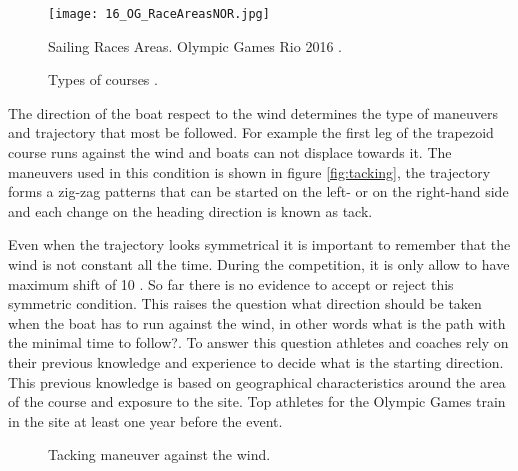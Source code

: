 \begin{figure}[ht]
\centering
 \texttt{[image: 16\_OG\_RaceAreasNOR.jpg]}
  \caption{Sailing Races Areas. Olympic Games Rio 2016 \cite{instr_rio}.}
\label{fig:olymp_areas_rio} 
\end{figure}

\begin{figure}[ht]
  \centering
  \hfill
  \caption{Types of courses \cite{instr_rio}.}
\label{fig:typecourses} 
\end{figure}

The direction of the boat respect to the wind determines the type of maneuvers and trajectory that most be followed. For example the first leg of the trapezoid course runs against the wind and boats can not displace towards it. The maneuvers used in this condition is shown in figure \ref{fig:tacking}, the trajectory forms a zig-zag patterns that can be started on the left- or on the right-hand side and each change on the heading direction is known as tack. \par 

Even when the trajectory looks symmetrical it is important to remember that the wind is not constant all the time. During the competition, it is only allow to have maximum shift of 10 \degree \cite{race_pol}. So far there is no evidence to accept or reject this symmetric condition. This raises the question what direction should be taken when the boat has to run against the wind, in other words what is the path with the minimal time to follow?. To answer this question athletes and coaches rely on their previous knowledge and experience to decide what is the starting direction. This previous knowledge is based on geographical characteristics around the area of the course and exposure to the site. Top athletes for the Olympic Games train in the site at least one year before the event.\par 
\begin{figure}[ht]
  \centering
  \hfill
   \centering
  \caption{Tacking maneuver against the wind.}
\label{fig:tack_against_wind} 
\end{figure}

